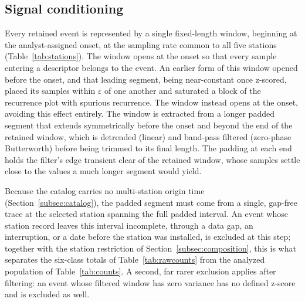 \documentclass[pdflatex,sn-mathphys-num]{sn-jnl}
\begin{document}
\subsection{Signal conditioning}\label{subsec:conditioning}

Every retained event is represented by a single fixed-length window,
beginning at the analyst-assigned onset, at the sampling rate common to all
five stations (Table~\ref{tab:stations}). The window opens at the onset so
that every sample entering a descriptor belongs to the event. An earlier
form of this window opened before the onset, and that leading segment,
being near-constant once z-scored, placed its samples within $\varepsilon$
of one another and saturated a block of the recurrence plot with spurious
recurrence. The window instead opens at the onset, avoiding this effect
entirely. The window is extracted from a longer padded segment that
extends symmetrically before the onset and beyond the end of the retained
window, which is detrended (linear) and band-pass filtered (zero-phase
Butterworth) before being trimmed to its final length. The padding at each
end holds the filter's edge transient clear of the retained window, whose
samples settle close to the values a much longer segment would yield.

Because the catalog carries no multi-station origin time
(Section~\ref{subsec:catalog}), the padded segment must come from a single,
gap-free trace at the selected station spanning the full padded interval. An
event whose station record leaves this interval incomplete, through a data
gap, an interruption, or a date before the station was installed, is excluded
at this step; together with the station restriction of
Section~\ref{subsec:composition}, this is what separates the six-class
totals of Table~\ref{tab:rawcounts} from the analyzed population of
Table~\ref{tab:counts}. A second, far rarer exclusion applies after
filtering: an event whose filtered window has zero variance has no defined
z-score and is excluded as well.
\end{document}
